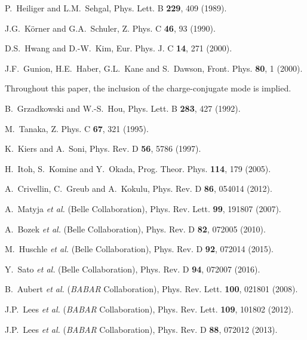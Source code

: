 \documentclass[aps,prd,twocolumn,superscriptaddress,showpacs,preprintnumbers,amsmath,amssymb]{revtex4-1}
\begin{document}
\begin{thebibliography}{99}

  P.~Heiliger and L.M.~Sehgal,
  Phys. Lett. B {\bf 229}, 409 (1989).

  J.G.~K\"orner and G.A.~Schuler,
  Z. Phys. C {\bf 46}, 93 (1990).

  D.S.~Hwang and D.-W.~Kim,
  Eur. Phys. J. C {\bf 14}, 271 (2000).
  
  J.F.~Gunion, H.E.~Haber, G.L.~Kane and S.~Dawson,
  Front. Phys. {\bf 80}, 1 (2000).

  Throughout this paper, the inclusion of the charge-conjugate mode is implied.

  B.~Grzadkowski and W.-S.~Hou,
  Phys. Lett. B {\bf 283}, 427 (1992).
  
  M.~Tanaka,
  Z. Phys. C {\bf 67}, 321 (1995).

  K.~Kiers and A.~Soni,
  Phys. Rev. D {\bf 56}, 5786 (1997).

  H.~Itoh, S.~Komine and Y.~Okada,
  Prog. Theor. Phys. {\bf 114}, 179 (2005).

  A.~Crivellin, C.~Greub and A.~Kokulu,
  Phys. Rev. D {\bf 86}, 054014 (2012).
  
  A.~Matyja {\it et al.} (Belle Collaboration),
  Phys. Rev. Lett. {\bf 99}, 191807 (2007).
  
  A.~Bozek {\it et al.} (Belle Collaboration),
  Phys. Rev. D {\bf 82}, 072005 (2010).
  
  M.~Huschle {\it et al.} (Belle Collaboration),
  Phys. Rev. D {\bf 92}, 072014 (2015).
  
  Y.~Sato {\it et al.} (Belle Collaboration),
  Phys. Rev. D {\bf 94}, 072007 (2016).

  B.~Aubert {\it et al.} (\textit{BABAR} Collaboration),
  Phys. Rev. Lett. {\bf 100}, 021801 (2008).

  J.P.~Lees {\it et al.} (\textit{BABAR} Collaboration),
  Phys. Rev. Lett. {\bf 109}, 101802 (2012).

  J.P.~Lees {\it et al.} (\textit{BABAR} Collaboration),
  Phys. Rev. D {\bf 88}, 072012 (2013).


\end{thebibliography}
\end{document}
